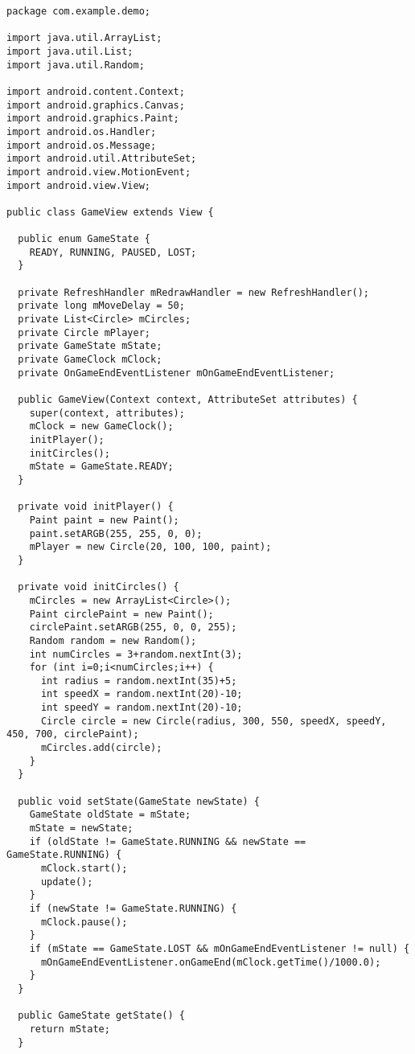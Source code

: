 \begin{lstlisting}[caption=GameView.java]
package com.example.demo;

import java.util.ArrayList;
import java.util.List;
import java.util.Random;

import android.content.Context;
import android.graphics.Canvas;
import android.graphics.Paint;
import android.os.Handler;
import android.os.Message;
import android.util.AttributeSet;
import android.view.MotionEvent;
import android.view.View;

public class GameView extends View {
	
  public enum GameState {
    READY, RUNNING, PAUSED, LOST;
  }
	
  private RefreshHandler mRedrawHandler = new RefreshHandler();
  private long mMoveDelay = 50;
  private List<Circle> mCircles;
  private Circle mPlayer;
  private GameState mState;
  private GameClock mClock;
  private OnGameEndEventListener mOnGameEndEventListener;
	
  public GameView(Context context, AttributeSet attributes) {
    super(context, attributes);
    mClock = new GameClock();
    initPlayer();
    initCircles();
    mState = GameState.READY;
  }

  private void initPlayer() {
    Paint paint = new Paint();
    paint.setARGB(255, 255, 0, 0);
    mPlayer = new Circle(20, 100, 100, paint);
  }

  private void initCircles() {
    mCircles = new ArrayList<Circle>();
    Paint circlePaint = new Paint();
    circlePaint.setARGB(255, 0, 0, 255);
    Random random = new Random();
    int numCircles = 3+random.nextInt(3);
    for (int i=0;i<numCircles;i++) {
      int radius = random.nextInt(35)+5;
      int speedX = random.nextInt(20)-10;
      int speedY = random.nextInt(20)-10;
      Circle circle = new Circle(radius, 300, 550, speedX, speedY, 450, 700, circlePaint);
      mCircles.add(circle);
    }
  }
	
  public void setState(GameState newState) {
    GameState oldState = mState;
    mState = newState;
    if (oldState != GameState.RUNNING && newState == GameState.RUNNING) {
      mClock.start();
      update();
    }
    if (newState != GameState.RUNNING) {
      mClock.pause();
    }
    if (mState == GameState.LOST && mOnGameEndEventListener != null) {
      mOnGameEndEventListener.onGameEnd(mClock.getTime()/1000.0);
    }
  }
	
  public GameState getState() {
    return mState;
  }
	

\end{lstlisting}
